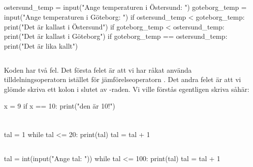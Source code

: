 \subsection*{}
\vspace{3pt}
\begin{python}
ostersund_temp = input("Ange temperaturen i Östersund: ")
goteborg_temp = input("Ange temperaturen i Göteborg: ")
if ostersund_temp < goteborg_temp:
    print("Det är kallast i Östersund")
if goteborg_temp < ostersund_temp:
    print("Det är kallast i Göteborg")
if goteborg_temp == ostersund_temp:
    print("Det är lika kallt")
\end{python}

\subsection*{}
Koden har två fel. Det första felet är att vi har råkat använda tilldelningsoperatorn \cw{=} istället för jämförelseoperatorn \cw{==}. Det andra felet är att vi glömde skriva ett kolon i slutet av -raden. Vi ville förstås egentligen skriva såhär:
\vspace{10pt}
\begin{python}
x = 9
if x == 10:
    print("den är 10!")
\end{python}



\section*{}

\subsection*{}
\vspace{3pt}
\begin{python}
tal = 1
while tal <= 20:
	print(tal)
	tal = tal + 1
\end{python}

\subsection*{}
\vspace{3pt}
\begin{python}
tal = int(input("Ange tal: "))
while tal <= 100:
	print(tal)
	tal = tal + 1
\end{python}

